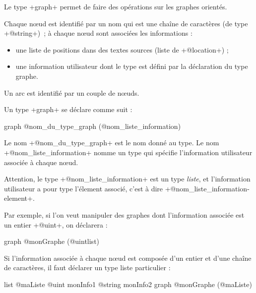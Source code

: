 



Le type \ggs+graph+ permet de faire des opérations sur les graphes orientés.

Chaque nœud est identifié par un nom qui est une chaîne de caractères (de type \ggs+@string+)~; à chaque nœud sont associées les informations :
\begin{itemize}
  \item une liste de positions dans des textes sources (liste de \ggs+@location+) ;
  \item une information utilisateur dont le type est défini par la déclaration du type graphe.
\end{itemize}

Un arc est identifié par un couple de nœuds.


Un type \ggs+graph+ se déclare comme suit :
\begin{galgas}
graph @nom_du_type_graph (@nom_liste_information) {
}
\end{galgas}

Le nom \ggs+@nom_du_type_graph+ est le nom donné au type. Le nom \ggs+@nom_liste_information+ nomme un type qui spécifie l'information utilisateur associée à chaque nœud.

Attention, le type \ggs+@nom_liste_information+ est un type \emph{liste}, et l'information utilisateur a pour type l'élement associé, c'est à dire \ggs+@nom_liste_information-element+. 

Par exemple, si l'on veut manipuler des graphes dont l'information associée est un entier \ggs+@uint+, on déclarera :
\begin{galgas}
graph @monGraphe (@uintlist) {
}
\end{galgas}

Si l'information associée à chaque nœud est composée d'un entier et d'une chaîne de caractères, il faut déclarer un type liste particulier :
\begin{galgas}
list @maListe {
  @uint monInfo1
  @string monInfo2
}
graph @monGraphe (@maListe) {
}
\end{galgas}






